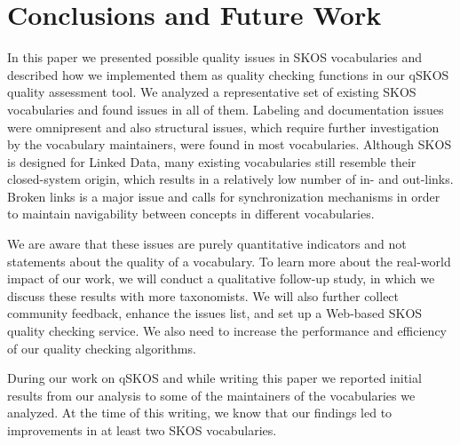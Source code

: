 \section{Conclusions and Future Work}\label{sec:conclusions}

In this paper we presented possible quality issues in SKOS vocabularies and described how we implemented them as quality checking functions in our qSKOS quality assessment tool. We analyzed a representative set of existing SKOS vocabularies and found  issues in all of them. Labeling and documentation issues were omnipresent and also structural issues, which require further investigation by the vocabulary maintainers, were found in most vocabularies. Although SKOS is designed for Linked Data, many existing vocabularies still resemble their closed-system origin, which results in a relatively low number of in- and out-links. Broken links is a major issue and calls for synchronization mechanisms in order to maintain navigability between concepts in different vocabularies.

We are aware that these issues are purely quantitative indicators and not statements about the quality of a vocabulary. To learn more about the real-world impact of our work, we will conduct a qualitative follow-up study, in which we discuss these results with more taxonomists. We will also further collect community feedback, enhance the issues list, and set up a Web-based SKOS quality checking service. We also need to increase the performance and efficiency of our quality checking algorithms.

During our work on qSKOS and while writing this paper we reported initial results from our analysis to some of the maintainers of the vocabularies we analyzed. At the time of this writing, we know that our findings led to improvements in at least two SKOS vocabularies.